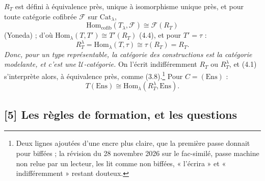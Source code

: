 \documentclass[11pt,a4paper]{article}
\begin{document}
$R_{T}$ est défini à équivalence près, unique à isomorphisme unique près,
et pour toute catégorie cofibrée $\mathcal{F}$ sur $\mathrm{Cat}_{\lambda}$,
\begin{equation}
\mathrm{Hom}_{\mathrm{cofib}}(T_{\lambda}, \mathcal{F}) \cong \mathcal{F}(R_{T})
\tag{4.3}
\end{equation}
(Yoneda) ; d'où $\mathrm{Hom}_{\lambda}(T, T') \cong T'(R_{T})$ (4.4), et
pour $T' = \tau$ :
\begin{equation}
R^{\lambda}_{T} = \mathrm{Hom}_{\lambda}(T, \tau) \cong \tau(R_{T}) = R_{T}.
\tag{4.5}
\end{equation}
\emph{Donc, pour un type représentable, la catégorie des constructions est
la catégorie modelante, et c'est une $\mathcal{U}$-catégorie.} On l'écrit
indifféremment $R_{T}$ ou $R^{\lambda}_{T}$, et (4.1) s'interprète alors, à
équivalence près, comme (3.8).\footnote{Deux lignes ajoutées d'une encre
plus claire, que la première passe donnait pour biffées ; la révision du 28 novembre 2026 sur le fac-similé, passe machine non relue par un lecteur, les lit comme
non biffées, « l'écrira » et « indifféremment » restant douteux.} Pour $C =
(\mathrm{Ens})$ :
\begin{equation}
T(\mathrm{Ens}) \cong \mathrm{Hom}_{\lambda}(R^{\lambda}_{T}, \mathrm{Ens}).
\tag{4.6}
\end{equation}

\subsection*{[5] Les règles de formation, et les questions}
\end{document}
